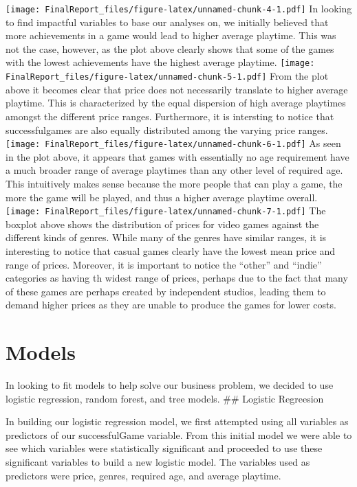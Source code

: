 \documentclass[]{article}
\begin{document}
\texttt{[image: FinalReport\_files/figure-latex/unnamed-chunk-4-1.pdf]}
In looking to find impactful variables to base our analyses on, we
initially believed that more achievements in a game would lead to higher
average playtime. This was not the case, however, as the plot above
clearly shows that some of the games with the lowest achievements have
the highest average playtime.
\texttt{[image: FinalReport\_files/figure-latex/unnamed-chunk-5-1.pdf]}
From the plot above it becomes clear that price does not necessarily
translate to higher average playtime. This is characterized by the equal
dispersion of high average playtimes amongst the different price ranges.
Furthermore, it is intersting to notice that successfulgames are also
equally distributed among the varying price ranges.
\texttt{[image: FinalReport\_files/figure-latex/unnamed-chunk-6-1.pdf]}
As seen in the plot above, it appears that games with essentially no age
requirement have a much broader range of average playtimes than any
other level of required age. This intuitively makes sense because the
more people that can play a game, the more the game will be played, and
thus a higher average playtime overall.
\texttt{[image: FinalReport\_files/figure-latex/unnamed-chunk-7-1.pdf]}
The boxplot above shows the distribution of prices for video games
against the different kinds of genres. While many of the genres have
similar ranges, it is interesting to notice that casual games clearly
have the lowest mean price and range of prices. Moreover, it is
important to notice the ``other'' and ``indie'' categories as having th
widest range of prices, perhaps due to the fact that many of these games
are perhaps created by independent studios, leading them to demand
higher prices as they are unable to produce the games for lower costs.

\hypertarget{models}{%
\section{Models}\label{models}}

In looking to fit models to help solve our business problem, we decided
to use logistic regression, random forest, and tree models. \#\#
Logistic Regreesion

In building our logistic regression model, we first attempted using all
variables as predictors of our successfulGame variable. From this
initial model we were able to see which variables were statistically
significant and proceeded to use these significant variables to build a
new logistic model. The variables used as predictors were price, genres,
required age, and average playtime.
\end{document}
